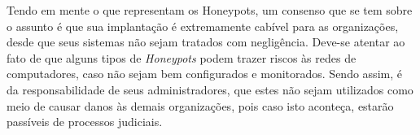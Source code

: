 Tendo em mente o que representam os Honeypots, um consenso que se tem sobre o assunto é que sua implantação é extremamente cabível para as organizações, desde que seus sistemas não sejam tratados com negligência. Deve-se atentar ao fato de que alguns tipos de \textit{Honeypots} podem trazer riscos às redes de computadores, caso não sejam bem configurados e monitorados. Sendo assim, é da responsabilidade de seus administradores, que estes não sejam utilizados como meio de causar danos às demais organizações, pois caso isto aconteça, estarão passíveis de processos judiciais.
